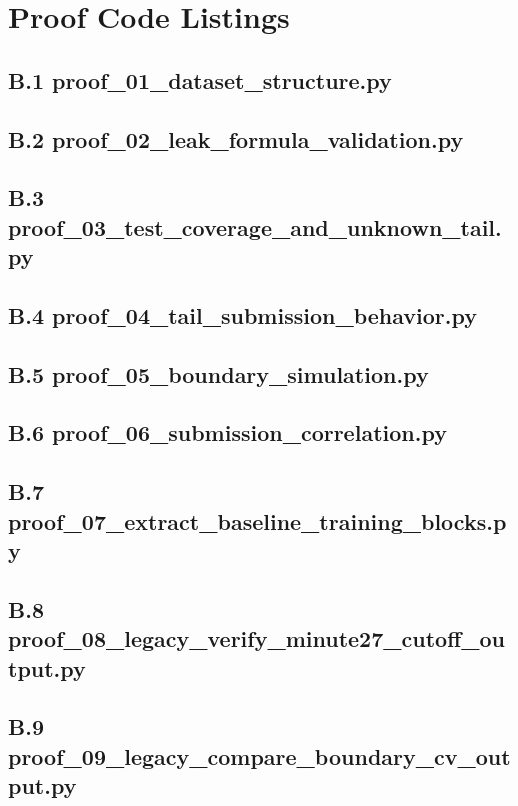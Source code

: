 \section{Proof Code Listings}

\subsection*{B.1 proof\_01\_dataset\_structure.py}


\subsection*{B.2 proof\_02\_leak\_formula\_validation.py}


\subsection*{B.3 proof\_03\_test\_coverage\_and\_unknown\_tail.py}


\subsection*{B.4 proof\_04\_tail\_submission\_behavior.py}


\subsection*{B.5 proof\_05\_boundary\_simulation.py}


\subsection*{B.6 proof\_06\_submission\_correlation.py}


\subsection*{B.7 proof\_07\_extract\_baseline\_training\_blocks.py}


\subsection*{B.8 proof\_08\_legacy\_verify\_minute27\_cutoff\_output.py}


\subsection*{B.9 proof\_09\_legacy\_compare\_boundary\_cv\_output.py}

